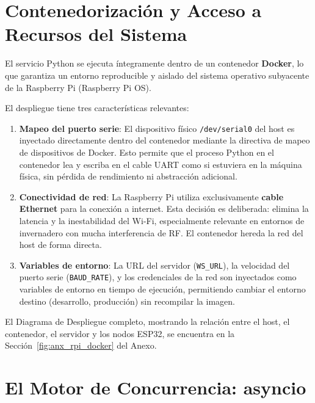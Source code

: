 \section{Contenedorización y Acceso a Recursos del Sistema}

El servicio Python se ejecuta íntegramente dentro de un contenedor \textbf{Docker}, lo que garantiza 
un entorno reproducible y aislado del sistema operativo subyacente de la Raspberry Pi (Raspberry Pi OS).

El despliegue tiene tres características relevantes:

\begin{enumerate}
    \item \textbf{Mapeo del puerto serie}: El dispositivo físico \texttt{/dev/serial0} del host 
          es inyectado directamente dentro del contenedor mediante la directiva de mapeo de 
          dispositivos de Docker. Esto permite que el proceso Python en el contenedor lea y escriba 
          en el cable UART como si estuviera en la máquina física, sin pérdida de rendimiento ni 
          abstracción adicional.
    
    \item \textbf{Conectividad de red}: La Raspberry Pi utiliza exclusivamente \textbf{cable Ethernet} 
          para la conexión a internet. Esta decisión es deliberada: elimina la latencia y la 
          inestabilidad del Wi-Fi, especialmente relevante en entornos de invernadero con mucha 
          interferencia de RF. El contenedor hereda la red del host de forma directa.
    
    \item \textbf{Variables de entorno}: La URL del servidor (\texttt{WS\_URL}), la velocidad del 
          puerto serie (\texttt{BAUD\_RATE}), y los credenciales de la red son inyectados como 
          variables de entorno en tiempo de ejecución, permitiendo cambiar el entorno destino 
          (desarrollo, producción) sin recompilar la imagen.
\end{enumerate}

El Diagrama de Despliegue completo, mostrando la relación entre el host, el contenedor, el 
servidor y los nodos ESP32, se encuentra en la Sección~\ref{fig:anx_rpi_docker} del Anexo.


\section{El Motor de Concurrencia: asyncio}


